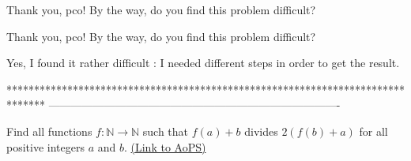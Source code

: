 \begin{solution}
	Thank you, pco! By the way, do you find this problem difficult?
\end{solution}



\begin{solution}
	\begin{tcolorbox}Thank you, pco! By the way, do you find this problem difficult?\end{tcolorbox}
Yes, I found it rather difficult : I needed different steps in order to get the result.
\end{solution}
*******************************************************************************
-------------------------------------------------------------------------------

\begin{problem}
	Find all functions $f:\mathbb{N}\rightarrow\mathbb{N}$ such that $f(a)+b$ divides $2(f(b)+a)$ for all positive integers $a$ and $b$.
	\flushright \href{https://artofproblemsolving.com/community/c6h405833}{(Link to AoPS)}
\end{problem}



